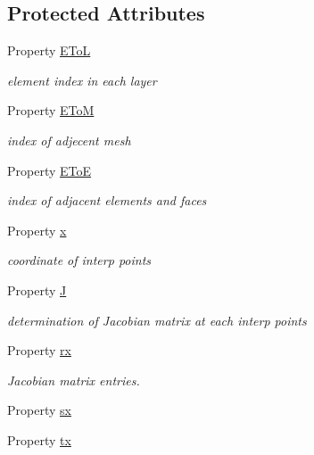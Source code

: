 \subsection*{Protected Attributes}
\begin{DoxyCompactItemize}
\item 
Property \hyperlink{class_ndg_extend_mesh3d_accb32b151195a5247f58836cbaf6dc30}{E\+ToL}
\begin{DoxyCompactList}\small\item\em element index in each layer \end{DoxyCompactList}\item 
Property \hyperlink{class_ndg_extend_mesh3d_a1a2e5c2de80b2827daac20f40ab178b0}{E\+ToM}
\begin{DoxyCompactList}\small\item\em index of adjecent mesh \end{DoxyCompactList}\item 
Property \hyperlink{class_ndg_extend_mesh3d_af30d668453d4c28ff1dbd43cd9ef25b9}{E\+ToE}
\begin{DoxyCompactList}\small\item\em index of adjacent elements and faces \end{DoxyCompactList}\item 
Property \hyperlink{class_ndg_extend_mesh3d_adf3495103decb1d0f3b93fd0335f4d24}{x}
\begin{DoxyCompactList}\small\item\em coordinate of interp points \end{DoxyCompactList}\item 
Property \hyperlink{class_ndg_extend_mesh3d_aab4b23b87da0a6cc916b4967850ecd4e}{J}
\begin{DoxyCompactList}\small\item\em determination of Jacobian matrix at each interp points \end{DoxyCompactList}\item 
Property \hyperlink{class_ndg_extend_mesh3d_a8c1a5dd8c8a0ec0152d40f3ba7a03cfd}{rx}
\begin{DoxyCompactList}\small\item\em Jacobian matrix entries. \end{DoxyCompactList}\item 
Property \hyperlink{class_ndg_extend_mesh3d_aeac715fab7dd42bc3cd5d176daae2a65}{sx}
\item 
Property \hyperlink{class_ndg_extend_mesh3d_ae4f57beec9e4432ddfd79244d6874dcf}{tx}
\item 

\end{DoxyCompactItemize}
